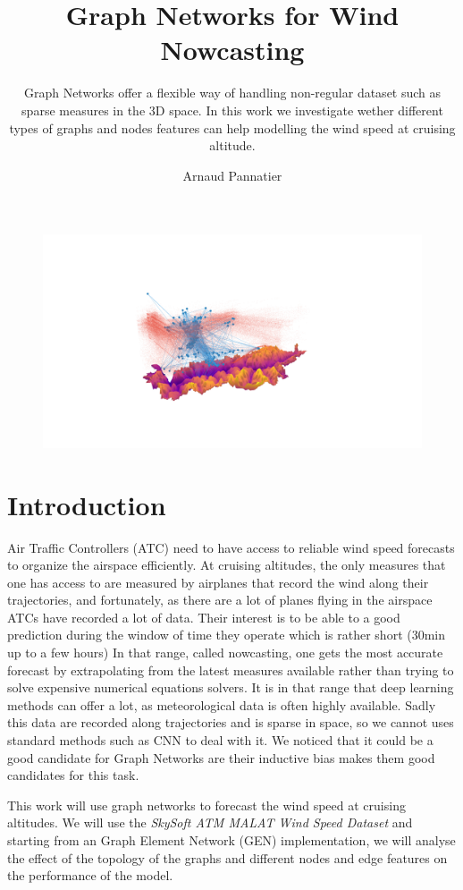\documentclass[a4paper,10pt]{article}
\title{Graph Networks for Wind Nowcasting}
\subtitle{ Graph Networks offer a flexible way of handling non-regular dataset such as sparse measures in the 3D space. In this work we investigate wether different types of graphs and nodes features can help modelling the wind speed at cruising altitude.}
\author{Arnaud Pannatier}
\begin{document}
\maketitle

\begin{figure}[htbp]
  \centering
  \includegraphics[trim={350 200 450 150},clip,width=\textwidth]{figs/south-gen.png}
\end{figure}

\newpage
\section{Introduction}
Air Traffic Controllers (ATC) need to have access to reliable wind speed forecasts to organize the airspace efficiently. At cruising altitudes, the only measures that one has access to are measured by airplanes that record the wind along their trajectories, and fortunately, as there are a lot of planes flying in the airspace ATCs have recorded a lot of data. Their interest is to be able to a good prediction during the window of time they operate which is rather short (30min up to a few hours) In that range, called nowcasting, one gets the most accurate forecast by extrapolating from the latest measures available rather than trying to solve expensive numerical equations solvers.
It is in that range that deep learning methods can offer a lot, as meteorological data is often highly available. Sadly this data are recorded along trajectories and is sparse in space, so we cannot uses standard methods such as CNN to deal with it. We noticed that it could be a good candidate for Graph Networks are their inductive bias makes them good candidates for this task.

This work will use graph networks to forecast the wind speed at cruising altitudes. We will use the \textit{SkySoft ATM MALAT Wind Speed Dataset} \cite{skysoft2021dataset} and starting from an Graph Element Network (GEN) \cite{alet2019gen} implementation, we will analyse the effect of the topology of the graphs and different nodes and edge features on the performance of the model.
\end{document}
